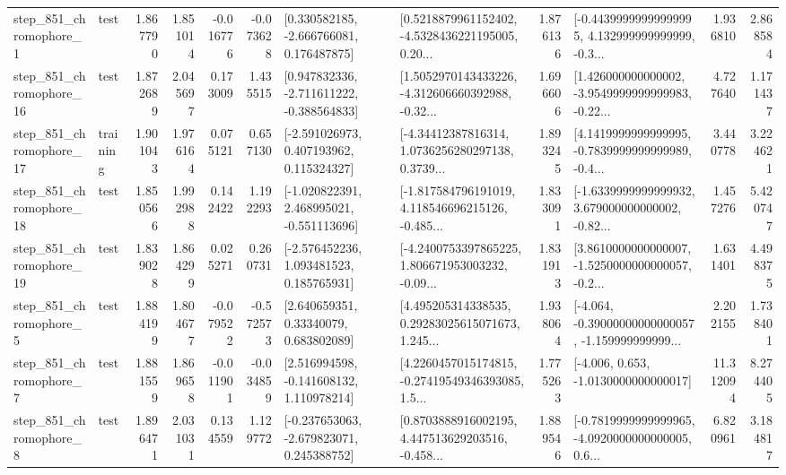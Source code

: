\begin{tabular}{llrrrrllrlrr}
   step\_851\_chromophore\_1 &      test &      1.867790 &    1.851014 &     -0.016776 & -0.073628 &    [0.330582185, -2.666766081, 0.176487875] &  [0.5218879961152402, -4.5328436221195005, 0.20... &       1.876136 &  [-0.44399999999999995, 4.132999999999999, -0.3... &            1.936810 &          2.868584 \\
  step\_851\_chromophore\_16 &      test &      1.872689 &    2.045697 &      0.173009 &  1.435515 &   [0.947832336, -2.711611222, -0.388564833] &  [1.5052970143433226, -4.312606660392988, -0.32... &       1.696606 &  [1.426000000000002, -3.9549999999999983, -0.22... &            4.727640 &          1.171437 \\
  step\_851\_chromophore\_17 &  training &      1.901043 &    1.976164 &      0.075121 &  0.657130 &    [-2.591026973, 0.407193962, 0.115324327] &  [-4.34412387816314, 1.0736256280297138, 0.3739... &       1.893245 &  [4.1419999999999995, -0.7839999999999989, -0.4... &            3.440778 &          3.224621 \\
  step\_851\_chromophore\_18 &      test &      1.850566 &    1.992988 &      0.142422 &  1.192293 &   [-1.020822391, 2.468995021, -0.551113696] &  [-1.817584796191019, 4.118546696215126, -0.485... &       1.833091 &  [-1.6339999999999932, 3.679000000000002, -0.82... &            1.457276 &          5.420747 \\
  step\_851\_chromophore\_19 &      test &      1.839028 &    1.864299 &      0.025271 &  0.260731 &    [-2.576452236, 1.093481523, 0.185765931] &  [-4.2400753397865225, 1.806671953003232, -0.09... &       1.831913 &  [3.8610000000000007, -1.5250000000000057, -0.2... &            1.631401 &          4.498375 \\
   step\_851\_chromophore\_5 &      test &      1.884199 &    1.804677 &     -0.079522 & -0.572573 &      [2.640659351, 0.33340079, 0.683802089] &  [4.495205314338535, 0.29283025615071673, 1.245... &       1.938064 &  [-4.064, -0.39000000000000057, -1.159999999999... &            2.202155 &          1.738401 \\
   step\_851\_chromophore\_7 &      test &      1.881559 &    1.869658 &     -0.011901 & -0.034859 &    [2.516994598, -0.141608132, 1.110978214] &  [4.2260457015174815, -0.27419549346393085, 1.5... &       1.775263 &               [-4.006, 0.653, -1.0130000000000017] &           11.312094 &          8.274405 \\
   step\_851\_chromophore\_8 &      test &      1.896471 &    2.031031 &      0.134559 &  1.129772 &   [-0.237653063, -2.679823071, 0.245388752] &  [0.8703888916002195, 4.447513629203516, -0.458... &       1.889546 &  [-0.7819999999999965, -4.0920000000000005, 0.6... &            6.820961 &          3.184817 \\

\end{tabular}
